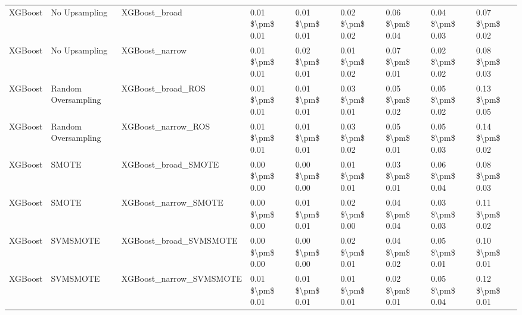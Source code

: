 \begin{tabular}{lllllllll}
                        XGBoost &                 No Upsampling &                                XGBoost\_broad & 0.01 \$\textbackslash pm\$ 0.01 &           0.01 \$\textbackslash pm\$ 0.01 &       0.02 \$\textbackslash pm\$ 0.02 &        0.06 \$\textbackslash pm\$ 0.04 &                         0.04 \$\textbackslash pm\$ 0.03 &     0.07 \$\textbackslash pm\$ 0.02 \\
                        XGBoost &                 No Upsampling &                               XGBoost\_narrow & 0.01 \$\textbackslash pm\$ 0.01 &           0.02 \$\textbackslash pm\$ 0.01 &       0.01 \$\textbackslash pm\$ 0.02 &        0.07 \$\textbackslash pm\$ 0.01 &                         0.02 \$\textbackslash pm\$ 0.02 &     0.08 \$\textbackslash pm\$ 0.03 \\
                        XGBoost &           Random Oversampling &                            XGBoost\_broad\_ROS & 0.01 \$\textbackslash pm\$ 0.01 &           0.01 \$\textbackslash pm\$ 0.01 &       0.03 \$\textbackslash pm\$ 0.01 &        0.05 \$\textbackslash pm\$ 0.02 &                         0.05 \$\textbackslash pm\$ 0.02 &     0.13 \$\textbackslash pm\$ 0.05 \\
                        XGBoost &           Random Oversampling &                           XGBoost\_narrow\_ROS & 0.01 \$\textbackslash pm\$ 0.01 &           0.01 \$\textbackslash pm\$ 0.01 &       0.03 \$\textbackslash pm\$ 0.02 &        0.05 \$\textbackslash pm\$ 0.01 &                         0.05 \$\textbackslash pm\$ 0.03 &     0.14 \$\textbackslash pm\$ 0.02 \\
                        XGBoost &                         SMOTE &                          XGBoost\_broad\_SMOTE & 0.00 \$\textbackslash pm\$ 0.00 &           0.00 \$\textbackslash pm\$ 0.00 &       0.01 \$\textbackslash pm\$ 0.01 &        0.03 \$\textbackslash pm\$ 0.01 &                         0.06 \$\textbackslash pm\$ 0.04 &     0.08 \$\textbackslash pm\$ 0.03 \\
                        XGBoost &                         SMOTE &                         XGBoost\_narrow\_SMOTE & 0.00 \$\textbackslash pm\$ 0.00 &           0.01 \$\textbackslash pm\$ 0.01 &       0.02 \$\textbackslash pm\$ 0.00 &        0.04 \$\textbackslash pm\$ 0.04 &                         0.03 \$\textbackslash pm\$ 0.03 &     0.11 \$\textbackslash pm\$ 0.02 \\
                        XGBoost &                      SVMSMOTE &                       XGBoost\_broad\_SVMSMOTE & 0.00 \$\textbackslash pm\$ 0.00 &           0.00 \$\textbackslash pm\$ 0.00 &       0.02 \$\textbackslash pm\$ 0.01 &        0.04 \$\textbackslash pm\$ 0.02 &                         0.05 \$\textbackslash pm\$ 0.01 &     0.10 \$\textbackslash pm\$ 0.01 \\
                        XGBoost &                      SVMSMOTE &                      XGBoost\_narrow\_SVMSMOTE & 0.01 \$\textbackslash pm\$ 0.01 &           0.01 \$\textbackslash pm\$ 0.01 &       0.01 \$\textbackslash pm\$ 0.01 &        0.02 \$\textbackslash pm\$ 0.01 &                         0.05 \$\textbackslash pm\$ 0.04 &     0.12 \$\textbackslash pm\$ 0.01 \\
\bottomrule
\end{tabular}

